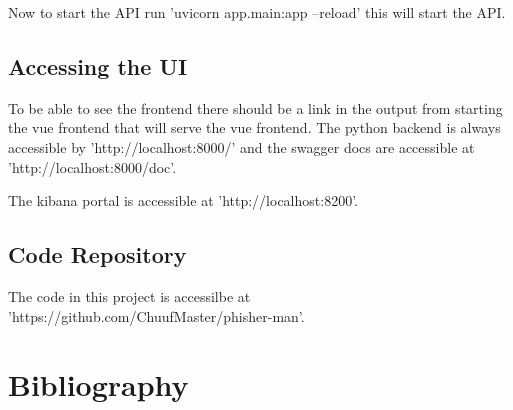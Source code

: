 \documentclass[a4paper,10pt]{article}
\begin{document}
Now to start the API run 'uvicorn app.main:app --reload' this will start the
API. \par

\subsection{Accessing the UI}

To be able to see the frontend there should be a link in the output from
starting the vue frontend that will serve the vue frontend. The python backend
is always accessible by 'http://localhost:8000/' and the swagger docs are
accessible at 'http://localhost:8000/doc'. \par

The kibana portal is accessible at 'http://localhost:8200'.\par

\subsection{Code Repository}

The code in this project is accessilbe at 'https://github.com/ChuufMaster/phisher-man'. \par

\pagebreak
\section{Bibliography}



\printindex
\end{document}
